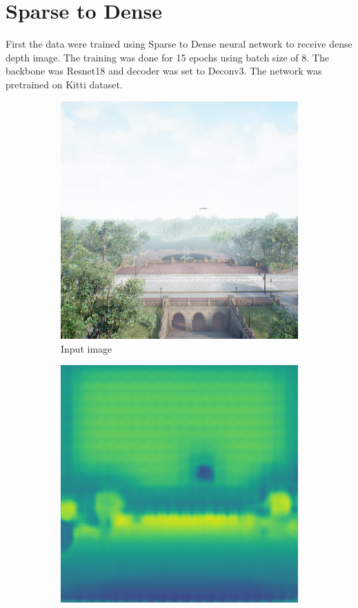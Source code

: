 \documentclass[twoside]{ctuthesis}
\theoremstyle{plain}
\theoremstyle{definition}
\theoremstyle{note}
\begin{document}
\section{Sparse to Dense}
First the data were trained using Sparse to Dense neural network to receive dense depth image. The training was done for 15 epochs using batch size of 8. The backbone was Resnet18 and decoder was set to Deconv3. The network was pretrained on Kitti dataset.
\begin{figure}
	\centering
	\begin{subfigure}[b]{0.4\textwidth}
		\centering
		\includegraphics[width=\textwidth]{s2d_input.png}
		\caption{Input image}
	\end{subfigure}
	\hfill
	\begin{subfigure}[b]{0.4\textwidth}
		\centering
		\includegraphics[width=\textwidth]{s2d_output.png}

\end{subfigure}
\end{figure}
\end{document}
